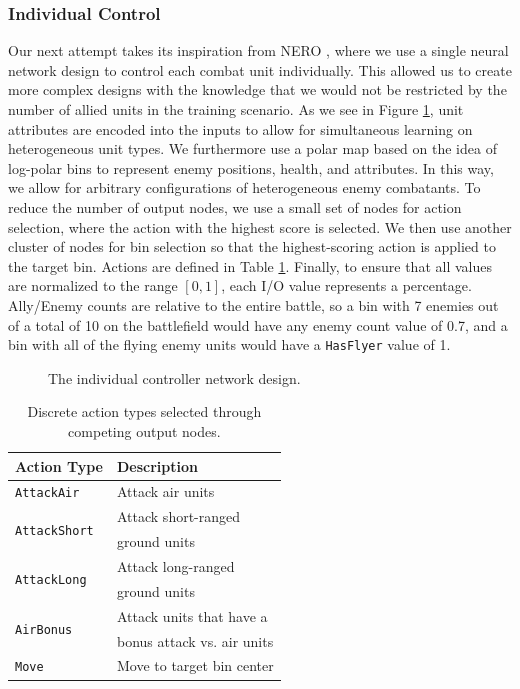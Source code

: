 \documentclass[10pt,a4paper,twocolumn]{article}
\begin{document}
\subsubsection{Individual Control}
\label{sec:individual_design}

Our next attempt takes its inspiration from NERO \cite{stanley:ieeetec05}, where we use a single neural network design to control each combat unit individually. This allowed us to create more complex designs with the knowledge that we would not be restricted by the number of allied units in the training scenario. As we see in Figure \ref{fig:design_individual}, unit attributes are encoded into the inputs to allow for simultaneous learning on heterogeneous unit types. We furthermore use a polar map based on the idea of log-polar bins to represent enemy positions, health, and attributes. In this way, we allow for arbitrary configurations of heterogeneous enemy combatants. To reduce the number of output nodes, we use a small set of nodes for action selection, where the action with the highest score is selected. We then use another cluster of nodes for bin selection so that the highest-scoring action is applied to the target bin. Actions are defined in Table \ref{tab:actions}. Finally, to ensure that all values are normalized to the range $[0,1]$, each I/O value represents a percentage. Ally/Enemy counts are relative to the entire battle, so a bin with 7 enemies out of a total of 10 on the battlefield would have any enemy count value of 0.7, and a bin with all of the flying enemy units would have a \texttt{HasFlyer} value of 1.

\begin{figure}

\caption{The individual controller network design.}
\label{fig:design_individual}
\end{figure}

\begin{table}
\centering
\begin{tabular}{|l|l|}
	\hline
	{\bf Action Type} & {\bf Description}\\ \hline
	\texttt{AttackAir} & Attack air units\\ \hline
	\multirow{2}{*}{\texttt{AttackShort}} & Attack short-ranged \\
	& ground units\\ \hline
	\multirow{2}{*}{\texttt{AttackLong}} & Attack long-ranged \\ 
	& ground units\\ \hline
	\multirow{2}{*}{\texttt{AirBonus}} & Attack units that have a \\
	& bonus attack vs. air units\\ \hline
	\texttt{Move} & Move to target bin center\\ \hline
\end{tabular}
\caption{Discrete action types selected through competing output nodes.}
\label{tab:actions}
\end{table}
\end{document}

